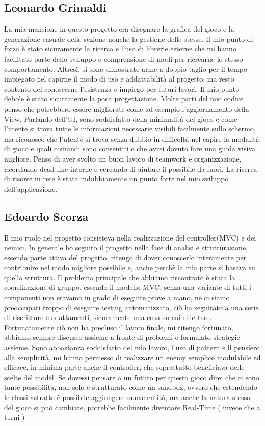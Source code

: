 \documentclass[a4paper,12pt]{report}
\begin{document}
\subsection*{Leonardo Grimaldi}

La mia mansione in questo progetto era disegnare la grafica del gioco e la generazione casuale delle sezione nonché la gestione delle stesse.
%
Il mio punto di forza è stato sicuramente la ricerca e l'uso di librerie esterne che mi hanno facilitato parte dello sviluppo e comprensione di modi per ricrearne lo stesso comportamento.
%
Altresì, si sono dimostrate arme a doppio taglio per il tempo impiegato nel capirne il modo di uso e addattabilità al progetto, ma resto contento del conoscerne l'esistenza e impiego per futuri lavori.
%
Il mio punto debole è stato sicuramente la poca progettazione.
%
Molte parti del mio codice penso che potrebbero essere migliorate come ad esempio l'aggiornamento della View.
%
Parlando dell'UI, sono soddisfatto della minimalità del gioco e come l'utente si trova tutte le informazioni necessarie visibili facilmente sullo schermo, ma riconosco che l'utente si trova senza dubbio in difficoltà nel capire la modalità di gioco e quali comandi sono consentiti e che avrei dovuto fare una guida visiva migliore.
%
Penso di aver svolto un buon lavoro di teamwork e organizzazione, ricordando dead-line interne e cercando di aiutare il possibile da fuori.
%
La ricerca di risorse in rete è stata indubbiamente un punto forte nel mio sviluppo dell'applicazione.

\subsection*{Edoardo Scorza}

Il mio ruolo nel progetto consisteva nella realizzazione del controller(MVC) e dei nemici,
In generale ho seguito il progetto nella fase di analisi e strutturazione, essendo parte attiva del progetto, ritengo di dover conoscerlo interamente
per contribuire nel modo migliore possibile e, anche perchè la mia parte si basava su quella struttura.
Il problema principale che abbiamo riscontrato è stata la coordinazione di gruppo, essendo il modello MVC, senza una variante di tutti i componenti non eravamo 
in grado di eseguire prove a mano, ne ci siamo preoccupati troppo di eseguire testing automatizzato, ciò ha seguitato a una serie
di riscritture e adattamenti, sicuramente una cosa su cui riflettere.
Fortunatamente ciò non ha precluso il lavoro finale, mi ritengo fortunato, abbiamo sempre discusso assieme a fronte di 
problemi e formulato strategie assieme. Sono abbastanza soddisfatto del mio lavoro, l'uso di pattern e il pensiero alla semplicità, mi hanno permesso
di realizzare un enemy semplice modulabile ed efficace, in minima parte anche il controller, che soprattutto beneficiava delle scelte del model.
Se dovessi pensare a un futuro per questo gioco direi che ci sono tante possibilità, non solo è strutturato come un sandbox, ovvero che estendendo 
le classi astratte è possibile aggiungere nuove entità, ma anche la natura stessa del gioco si può cambiare, potrebbe facilmente diventare Real-Time ( invece che a turni )
\end{document}
